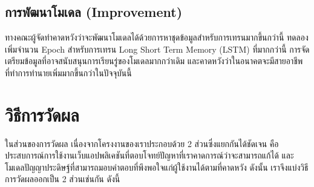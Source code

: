 \subsection{การพัฒนาโมเดล (Improvement)}
ทางคณะผู้จัดทำคาดหวังว่าจะพัฒนาโมเดลได้ด้วยการหาชุดข้อมูลสำหรับการเทรนมากขึ้นกว่านี้ ทดลองเพิ่มจำนวน Epoch สำหรับการเทรน
Long Short Term Memory (LSTM) ที่มากกว่านี้ การจัดเตรียมข้อมูลที่อาจสนับสนุนการเรียนรู่ของโมเดลมากกว่าเดิม และคาดหวังว่าในอนาคตจะมีสายอาชีพที่ทำการทำนายเพิ่มมากขึ้นกว่าในปัจจุบันนี้


\section{วิธีการวัดผล}
ในส่วนของการวัดผล เนื่องจากโครงงานของเราประกอบด้วย 2 ส่วนซึ่งแยกกันได้ชัดเจน คือ ประสบการณ์การใช้งานเว็บแอปพลิเคชันที่ตอบโจทย์ปัญหาที่เราคาดการณ์ว่าจะสามารถแก้ได้
และโมเดลปัญญาประดิษฐ์ที่สามารถมอบคำตอบที่พึงพอใจแก่ผู้ใช้งานได้ตามที่คาดหวัง ดังนั้น เราจึงแบ่งวิธีการวัดผลออกเป็น 2 ส่วนเช่นกัน ดังนี้

